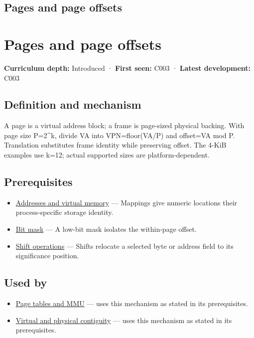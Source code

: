 \hypertarget{appendix-0c67cd5bf30a}{}
\section*{Pages and page offsets}
\chapter{Pages and page offsets}\label{appendix-0c67cd5bf30a-pages-and-page-offsets}

\textbf{Curriculum depth:} Introduced · \textbf{First seen:} C003 · \textbf{Latest development:} C003

\section{Definition and mechanism}\label{appendix-0c67cd5bf30a-definition-and-mechanism}

A page is a virtual address block; a frame is page-sized physical backing. With page size P=2\^{}k, divide VA into VPN=floor(VA/P) and offset=VA mod P. Translation substitutes frame identity while preserving offset. The 4-KiB examples use k=12; actual supported sizes are platform-dependent.

\section{Prerequisites}\label{appendix-0c67cd5bf30a-prerequisites}

\begin{itemize}
\tightlist
\item
  \hyperref[appendix-18ee4f913c3c]{Addresses and virtual memory} --- Mappings give numeric locations their process-specific storage identity.
\item
  \hyperref[appendix-dbe5905163c2]{Bit mask} --- A low-bit mask isolates the within-page offset.
\item
  \hyperref[appendix-73425b25118e]{Shift operations} --- Shifts relocate a selected byte or address field to its significance position.
\end{itemize}

\section{Used by}\label{appendix-0c67cd5bf30a-used-by}

\begin{itemize}
\tightlist
\item
  \hyperref[appendix-01e5905165c4]{Page tables and MMU} --- uses this mechanism as stated in its prerequisites.
\item
  \hyperref[appendix-f897c1ddac8f]{Virtual and physical contiguity} --- uses this mechanism as stated in its prerequisites.
\end{itemize}

